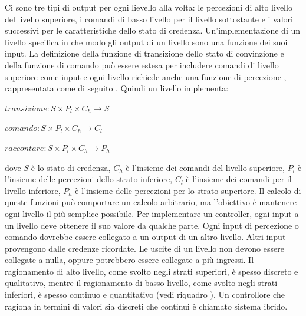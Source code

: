 \documentclass[a4paper]{extarticle}
\begin{document}
Ci sono tre tipi di output per ogni lievello alla volta: le percezioni di alto livello del livello superiore, i comandi di basso livello per il livello sottostante e i valori successivi per le caratteristiche dello stato di credenza. Un'implementazione di un livello specifica in che modo gli output di un livello sono una funzione dei suoi input. La definizione della funzione di transizione dello stato di convinzione e della funzione di comando può essere estesa per includere comandi di livello superiore come input e ogni livello richiede anche una funzione di percezione , rappresentata come di seguito . Quindi un livello implementa:
\begin{center}
$transizione: S \times P_l \times C_h \rightarrow S$

$comando: S \times P_l \times C_h \rightarrow C_l$

$raccontare: S \times P_l \times C_h \rightarrow P_h$
\end{center}
dove \textit{S} è lo stato di credenza, $C_h$ è l'insieme dei comandi del livello superiore, $P_l$ è l'insieme delle percezioni dello strato inferiore, $C_l$ è l'insieme dei comandi per il livello inferiore, $P_h$ è l'insieme delle percezioni per lo strato superiore. Il calcolo di queste funzioni può comportare un calcolo arbitrario, ma l'obiettivo è mantenere ogni livello il più semplice possibile. Per implementare un controller, ogni input a un livello deve ottenere il suo valore da qualche parte. Ogni input di percezione o comando dovrebbe essere collegato a un output di un altro livello. Altri input provengono dalle credenze ricordate. Le uscite di un livello non devono essere collegate a nulla, oppure potrebbero essere collegate a più ingressi. Il ragionamento di alto livello, come svolto negli strati superiori, è spesso discreto e qualitativo, mentre il ragionamento di basso livello, come svolto negli strati inferiori, è spesso continuo e quantitativo (vedi riquadro ). Un controllore che ragiona in termini di valori sia discreti che continui è chiamato sistema ibrido.
\end{document}
